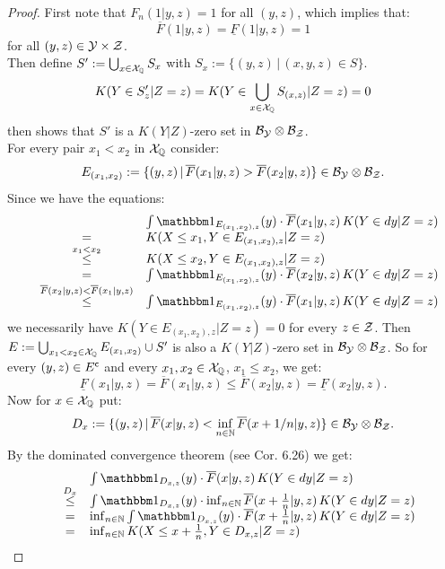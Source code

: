 \begin{Thm}
\begin{proof}
First note that $F_n(1|y,z)=1$ for all $(y,z)$, which implies that:
$$\overline  F(1|y,z) = \underline  F(1|y,z) = 1 $$
for all $(y,z) \in \Ycal \times \Zcal$. \\
Then define $S':= \bigcup_{x \in \Xcal_\Q} S_x$ with $S_x:=\{(y,z)\,|\, (x,y,z) \in S\}$. 
$$ K(Y \in S'_z | Z=z) = K(Y \in \bigcup_{x \in \Xcal_\Q} S_{(x,z)} | Z=z) = 0 $$
then shows that $S'$ is a $K(Y|Z)$-zero set in $\Bcal_\Ycal \otimes \Bcal_\Zcal$.\\
For every pair $x_1<x_2$ in $\Xcal_\Q$ consider:
$$ E_{(x_1,x_2)} := \{ (y,z) \,|\, \overline F(x_1|y,z) > \overline F(x_2|y,z) \} \in \Bcal_\Ycal \otimes \Bcal_\Zcal. $$ 
Since we have the equations:
$$ \begin{array}{rcl}
 &&\int \I_{E_{(x_1,x_2),z}}(y) \cdot \overline F(x_1|y,z) \, K(Y \in dy|Z=z) \\
&=& K(X \le x_1, Y \in E_{(x_1,x_2),z} |Z=z) \\
&\stackrel{x_1 < x_2}{\le}& K(X \le x_2, Y \in E_{(x_1,x_2),z} |Z=z)  \\
&=& \int \I_{E_{(x_1,x_2),z}}(y) \cdot \overline F(x_2|y,z) \, K(Y \in dy|Z=z) \\
&\stackrel{\overline F(x_2|y,z) < \overline F(x_1|y,z)}{\le} & \int \I_{E_{(x_1,x_2),z}}(y) \cdot \overline F(x_1|y,z) \, K(Y \in dy|Z=z)
\end{array}$$
we necessarily have $K(Y \in E_{(x_1,x_2),z} |Z=z) = 0$ for every $z \in \Zcal$.
Then $E:= \bigcup_{x_1 < x_2 \in \Xcal_\Q} E_{(x_1,x_2)} \cup S'$ is also a $K(Y|Z)$-zero set in $\Bcal_\Ycal \otimes \Bcal_\Zcal$.
So for every $(y,z) \in E^\cmpl$ and every $x_1,x_2 \in \Xcal_\Q$, $x_1 \le x_2$, we get:
$$\underline F(x_1|y,z) = \overline F(x_1|y,z) \le \overline F(x_2|y,z) = \underline F(x_2|y,z). $$
Now for $x \in \Xcal_\Q$ put: 
$$ D_x := \{ (y,z) \,|\, \overline F(x|y,z) <  \inf_{n \in \N} \overline F(x+1/n|y,z)  \} \in \Bcal_\Ycal \otimes \Bcal_\Zcal.$$
By the dominated convergence theorem (see \cite{Kle14}  Cor. 6.26) we get:
$$ \begin{array}{rcl}
&&  \int \I_{D_{x,z}}(y) \cdot \overline F(x|y,z) \, K(Y \in dy|Z=z) \\
&\stackrel{D_x}{\le}& \int \I_{D_{x,z}}(y) \cdot \inf_{n \in \N} \overline F(x+\frac{1}{n}|y,z) \, K(Y \in dy|Z=z) \\
&=& \inf_{n \in \N} \int \I_{D_{x,z}}(y) \cdot  \overline F(x+\frac{1}{n}|y,z) \, K(Y \in dy|Z=z) \\
&=& \inf_{n \in \N} K(X \le x + \frac{1}{n}, Y \in D_{x,z} |Z=z) \\

\end{array}$$
\end{proof}
\end{Thm}
